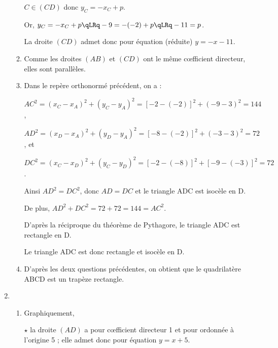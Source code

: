 \documentclass[12pt,french]{article}
\begin{document}
\begin{spacing}{1.2}
\begin{enumerate}[label=\arabic*.]
\begin{enumerate}[label=\alph*)]
	$C\in (CD)$ donc $y_C=-x_C+p$.
	
	Or, $y_C=-x_C+p\qLRq -9=-(-2)+p\qLRq -11=p$.
	
	La droite $(CD)$ admet donc pour équation (réduite) $y=-x-11$.
	
	\item %
	
	Comme les droites $(AB)$ et $(CD)$ ont le même c\oe{}fficient directeur, elles sont parallèles.
	
	\item %
	Dans le repère orthonormé précédent, on a :
	
	$AC^2=\left( x_C-x_A\right)^2+\left( y_C-y_A\right)^2=[-2-(-2)]^2+(-9-3)^2=144$,
	
	$AD^2=\left( x_D-x_A\right)^2+\left( y_D-y_A\right)^2=[-8-(-2)]^2+(-3-3)^2=72$, et 
	
	$DC^2=\left( x_C-x_D\right)^2+\left( y_C-y_D\right)^2=[-2-(-8)]^2+[-9-(-3)]^2=72$.
	
	Ainsi $AD^2=DC^2$, donc $AD=DC$ et le triangle ADC est isocèle en D.
	
	De plus, $AD^2+DC^2=72+72=144=AC^2$.
	
	D'après la réciproque du théorème de Pythagore, le triangle ADC est rectangle en D.
	
	Le triangle ADC est donc rectangle et isocèle en D.
	
	\item %
	D'après les deux questions précédentes, on obtient que le quadrilatère ABCD est un trapèze rectangle.
	
	\end{enumerate}

\item %

	\begin{enumerate}[label=\alph*)]
	\item %
	Graphiquement, 
	
	$\star$ la droite $(AD)$ a pour c\oe{}fficient directeur 1 et pour ordonnée à l'origine 5 ; elle admet donc pour équation $y=x+5$.
	

\end{enumerate}
\end{enumerate}
\end{spacing}
\end{document}
